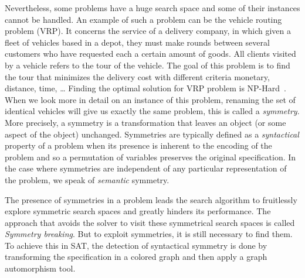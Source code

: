 Nevertheless, some problems have a huge search space and some of their instances cannot be handled.
An example of such a problem can be the vehicle routing problem (VRP).
It concerns the service of a delivery company, in which
given a fleet of vehicles based in a depot, they must make rounds between several customers  who have requested
each a certain amount of goods. All clients visited by a vehicle refers to the tour of the vehicle. 
The goal of this problem is to find the tour that minimizes the delivery cost with different criteria monetary, distance, time, …
Finding the optimal solution for VRP problem is NP-Hard~\cite{toth2002vehicle}.
When we look more in detail on an instance of this problem, renaming the set of identical vehicles will give us exactly the same problem,
this is called a \textit{symmetry}. More precisely, a symmetry is a transformation that leaves an object (or some aspect of the object) unchanged. Symmetries are typically defined as a \textit{syntactical} property of a problem when its presence is inherent to the encoding of the problem and so a permutation of variables preserves the original specification. In the case where symmetries are independent of any 
particular representation of the problem, we speak of \textit{semantic} symmetry.

The presence of symmetries in a problem leads the search algorithm to fruitlessly explore symmetric
search spaces and greatly hinders its performance.
 The approach that avoids the solver to visit these symmetrical search spaces is called \textit{Symmetry breaking}.
But to exploit symmetries, it is still necessary to find them.
To achieve this in SAT, the detection of syntactical symmetry is done by transforming the specification
in a colored graph and then apply a graph automorphism tool.


%
%
%
%
%
%
%
%
%

